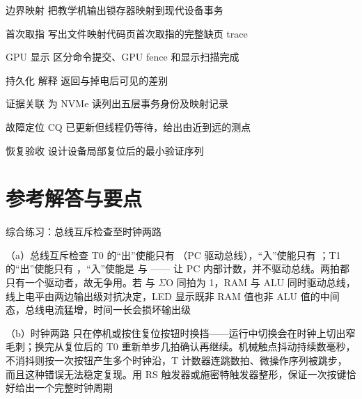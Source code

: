 \begin{chapterexercise}{边界映射}
把教学机输出锁存器映射到现代设备事务
\end{chapterexercise}

\begin{chapterexercise}{首次取指}
写出文件映射代码页首次取指的完整缺页 trace
\end{chapterexercise}

\begin{chapterexercise}{GPU 显示}
区分命令提交、GPU fence 和显示扫描完成
\end{chapterexercise}

\begin{chapterexercise}{持久化}
解释  返回与掉电后可见的差别
\end{chapterexercise}

\begin{chapterexercise}{证据关联}
为 NVMe 读列出五层事务身份及映射记录
\end{chapterexercise}

\begin{chapterexercise}{故障定位}
CQ 已更新但线程仍等待，给出由近到远的测点
\end{chapterexercise}

\begin{chapterexercise}{恢复验收}
设计设备局部复位后的最小验证序列
\end{chapterexercise}

\section*{参考解答与要点}

\begin{chapteranswer}{综合练习：总线互斥检查至时钟两路}
\begin{answersubproblem}{（a）总线互斥检查}
T0 的“出”使能只有 （PC 驱动总线），“入”使能只有 ；T1 的“出”使能只有 ，“入”使能是  与 —— 让 PC 内部计数，并不驱动总线。两拍都只有一个驱动者，故无争用。若  与 $\Sigma$O 同拍为 1，RAM 与 ALU 同时驱动总线，线上电平由两边输出级对抗决定，LED 显示既非 RAM 值也非 ALU 值的中间态，总线电流猛增，时间一长会损坏输出级
\end{answersubproblem}
\begin{answersubproblem}{（b）时钟两路}
只在停机或按住复位按钮时换挡——运行中切换会在时钟上切出窄毛刺；换完从复位后的 T0 重新单步几拍确认再继续。机械触点抖动持续数毫秒，不消抖则按一次按钮产生多个时钟沿，T 计数器连跳数拍、微操作序列被跳步，而且这种错误无法稳定复现。用 RS 触发器或施密特触发器整形，保证一次按键恰好给出一个完整时钟周期
\end{answersubproblem}
\end{chapteranswer}


